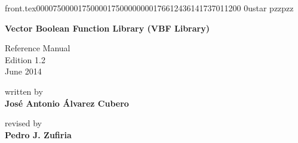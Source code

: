                                                                                                                                                                                                                                                                                                                                                                                                                       front.tex                                                                                           0000750 0001750 0001750 00000001766 12436141737 011200  0                                                                                                    ustar   pzz                             pzz                                                                                                                                                                                                                    %


\pagestyle{empty}
\sffamily

\vfill
\begin{center}
    \Huge\bfseries
    Vector Boolean Function Library (VBF Library)  
\end{center}

\vfill\vfill
\begin{center}
    \Large
    Reference Manual\\
    Edition 1.2\\
    June 2014\\
\end{center}


\vfill
\begin{center}
    \Large
    written by \\
    \huge\bfseries
    Jos\'e Antonio \'Alvarez Cubero
\end{center}


\vfill
\begin{center}
    \Large
    revised by \\
    \bfseries
    Pedro J. Zufiria
\end{center}

\cleardoublepage


\pagestyle{headings}
\tableofcontents

